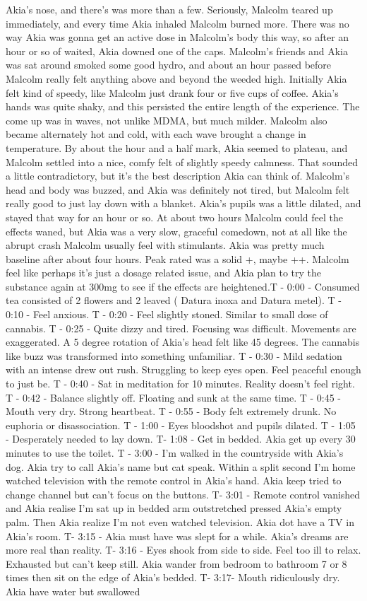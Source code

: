 \documentclass[12pt]{book}
\begin{document}
Akia's nose, and there's was more than a few. Seriously, Malcolm teared up immediately, and every time Akia inhaled Malcolm burned more. There was no way Akia was gonna get an active dose in Malcolm's body this way, so after an hour or so of waited, Akia downed one of the caps. Malcolm's friends and Akia was sat around smoked some good hydro, and about an hour passed before Malcolm really felt anything above and beyond the weeded high. Initially Akia felt kind of speedy, like Malcolm just drank four or five cups of coffee. Akia's hands was quite shaky, and this persisted the entire length of the experience. The come up was in waves, not unlike MDMA, but much milder. Malcolm also became alternately hot and cold, with each wave brought a change in temperature. By about the hour and a half mark, Akia seemed to plateau, and Malcolm settled into a nice, comfy felt of slightly speedy calmness. That sounded a little contradictory, but it's the best description Akia can think of. Malcolm's head and body was buzzed, and Akia was definitely not tired, but Malcolm felt really good to just lay down with a blanket. Akia's pupils was a little dilated, and stayed that way for an hour or so. At about two hours Malcolm could feel the effects waned, but Akia was a very slow, graceful comedown, not at all like the abrupt crash Malcolm usually feel with stimulants. Akia was pretty much baseline after about four hours. Peak rated was a solid +, maybe ++. Malcolm feel like perhaps it's just a dosage related issue, and Akia plan to try the substance again at 300mg to see if the effects are heightened.T - 0:00 - Consumed tea consisted of 2 flowers and 2 leaved ( Datura inoxa and Datura metel). T - 0:10 - Feel anxious. T - 0:20 - Feel slightly stoned. Similar to small dose of cannabis. T - 0:25 - Quite dizzy and tired. Focusing was difficult. Movements are exaggerated. A 5 degree rotation of Akia's head felt like 45 degrees. The cannabis like buzz was transformed into something unfamiliar. T - 0:30 - Mild sedation with an intense drew out rush. Struggling to keep eyes open. Feel peaceful enough to just be. T - 0:40 - Sat in meditation for 10 minutes. Reality doesn't feel right. T - 0:42 - Balance slightly off. Floating and sunk at the same time. T - 0:45 - Mouth very dry. Strong heartbeat. T - 0:55 - Body felt extremely drunk. No euphoria or disassociation. T - 1:00 - Eyes bloodshot and pupils dilated. T - 1:05 - Desperately needed to lay down. T- 1:08 - Get in bedded. Akia get up every 30 minutes to use the toilet. T - 3:00 - I'm walked in the countryside with Akia's dog. Akia try to call Akia's name but cat speak. Within a split second I'm home watched television with the remote control in Akia's hand. Akia keep tried to change channel but can't focus on the buttons. T- 3:01 - Remote control vanished and Akia realise I'm sat up in bedded arm outstretched pressed Akia's empty palm. Then Akia realize I'm not even watched television. Akia dot have a TV in Akia's room. T- 3:15 - Akia must have was slept for a while. Akia's dreams are more real than reality. T- 3:16 - Eyes shook from side to side. Feel too ill to relax. Exhausted but can't keep still. Akia wander from bedroom to bathroom 7 or 8 times then sit on the edge of Akia's bedded. T- 3:17- Mouth ridiculously dry. Akia have water but swallowed 
\end{document}
